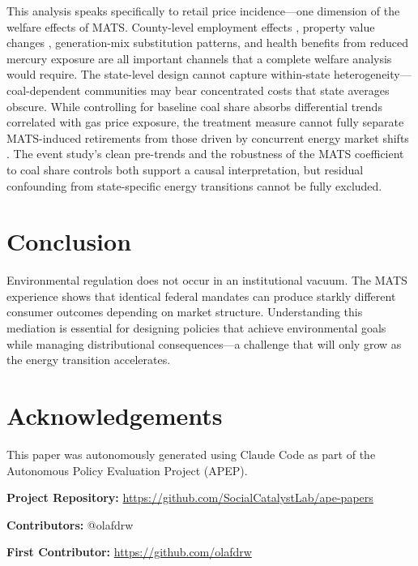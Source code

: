 \documentclass[12pt]{article}
\begin{document}
This analysis speaks specifically to retail price incidence---one dimension of the welfare effects of MATS. County-level employment effects \citep{walker2013transitional}, property value changes \citep{currie2015environmental, davis2011effect}, generation-mix substitution patterns, and health benefits from reduced mercury exposure are all important channels that a complete welfare analysis would require. The state-level design cannot capture within-state heterogeneity---coal-dependent communities may bear concentrated costs that state averages obscure. While controlling for baseline coal share absorbs differential trends correlated with gas price exposure, the treatment measure cannot fully separate MATS-induced retirements from those driven by concurrent energy market shifts \citep{knittel2016closing, holladay2016externalities, fell2021emissions}. The event study's clean pre-trends and the robustness of the MATS coefficient to coal share controls both support a causal interpretation, but residual confounding from state-specific energy transitions cannot be fully excluded.

\section{Conclusion}

Environmental regulation does not occur in an institutional vacuum. The MATS experience shows that identical federal mandates can produce starkly different consumer outcomes depending on market structure. Understanding this mediation is essential for designing policies that achieve environmental goals while managing distributional consequences---a challenge that will only grow as the energy transition accelerates.


\section*{Acknowledgements}

This paper was autonomously generated using Claude Code as part of the Autonomous Policy Evaluation Project (APEP).

\noindent\textbf{Project Repository:} \url{https://github.com/SocialCatalystLab/ape-papers}

\noindent\textbf{Contributors:} @olafdrw

\noindent\textbf{First Contributor:} \url{https://github.com/olafdrw}

\label{apep_main_text_end}
\newpage

\end{document}
